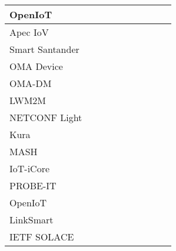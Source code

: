 \begin{table}[h!]
\begin{tabulary}{\textwidth}{L|C|C|C|C|C|C|C|C|C}
	OpenIoT         &              &              &             &          &             &            &             &                  &         \\\hline
	Apec IoV        &              &              &             &          &             &            &             &                  &         \\\hline
	Smart Santander &              &              &             &          &             &            &             &                  &         \\\hline
	OMA Device      &              &              &             &          &             &            &             &                  &         \\\hline
	OMA-DM          &              &              &             &          &             &            &             &                  &         \\\hline
	LWM2M           &              &              &             &          &             &            &             &                  &         \\\hline
	NETCONF Light   &              &              &             &          &             &            &             &                  &         \\\hline
	Kura            &              &              &             &          &             &            &             &                  &         \\\hline
	MASH            &              &              &             &          &             &            &             &                  &         \\\hline
	IoT-iCore       &              &              &             &          &             &            &             &                  &         \\\hline
	PROBE-IT        &              &              &             &          &             &            &             &                  &         \\\hline
	OpenIoT         &              &              &             &          &             &            &             &                  &         \\\hline
	LinkSmart       &              &              &             &          &             &            &             &                  &         \\\hline
	IETF SOLACE     &              &              &             &          &             &            &             &                  &         \\\hline

\end{tabulary}
\end{table}
